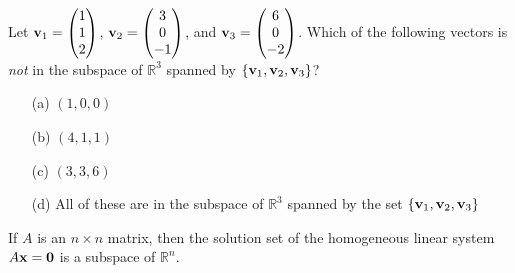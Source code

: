 \begin{problem}
    Let ${\bf v}_1 = \begin{pmatrix} 1 \\ 1 \\ 2 \end{pmatrix}$, ${\bf v}_2 = \begin{pmatrix} 3 \\
        0 \\ -1 \end{pmatrix}$, and ${\bf v}_3 = \begin{pmatrix} 6 \\ 0 \\ -2 \end{pmatrix}$.
            Which of the following vectors is {\it not} in the subspace of $\mathbb{R}^3$
            spanned by $\{ {\bf v}_1, {\bf v}_2, {\bf v}_3\}$?
    \begin{enumerate}
        \item[(a)] $(1,0,0)$
        \item[(b)] $(4,1,1)$
        \item[(c)] $(3,3,6)$
        \item[(d)] All of these are in the subspace of $\mathbb{R}^3$ spanned by the set
            $\{{\bf v}_1,{\bf v}_2,{\bf v}_3\}$
    \end{enumerate}
\end{problem}

%             



\begin{thm}
    If $A$ is an $n \times n$ matrix, then the solution set of the homogeneous linear
    system $A{\bf x} = {\bf 0}$ is a subspace of $\mathbb{R}^n$.
\end{thm}

